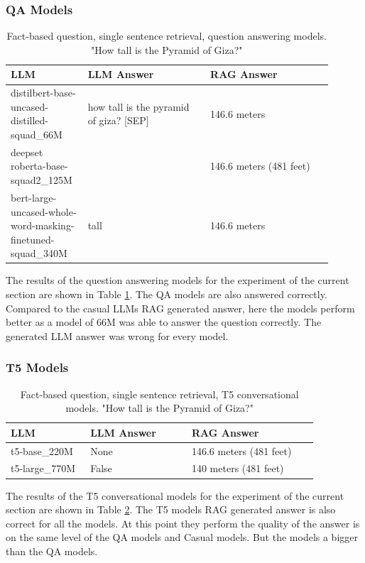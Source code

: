 \documentclass{wseas}
\begin{document}
\subsubsection{QA Models}

\begin{table}[htbp]
  \caption{Fact-based question, single sentence retrieval, question answering models. "How tall is the Pyramid of Giza?"} %
  \centering
  \label{tab:experiment_R_1_sentence_Q_fact_M_question_answering_table}  %
    \begin{tabular}{|p{0.2\linewidth}|p{0.35\linewidth}|p{0.35\linewidth}|}
      \hline
      \textbf{LLM} & \textbf{LLM Answer} & \textbf{RAG Answer} \\ \hline
      distilbert-base-uncased-distilled-squad\_66M & how tall is the pyramid of giza? {[}SEP{]} & 146.6 meters \\ \hline
      deepset roberta-base-squad2\_125M &  & 146.6 meters (481 feet) \\ \hline
      bert-large-uncased-whole-word-masking-finetuned-squad\_340M & tall & 146.6 meters \\ \hline
    \end{tabular}
\end{table}
The results of the question answering models for the experiment of the 
current section are shown in Table \ref{tab:experiment_R_1_sentence_Q_fact_M_question_answering_table}.
The QA models are also answered correctly. Compared to the casual LLMs
RAG generated answer, here the models perform better as a model of 66M
was able to answer the question correctly. The generated LLM answer was
wrong for every model.

\subsubsection{T5 Models}

\begin{table}[htbp]
  \centering
  \caption{Fact-based question, single sentence retrieval, T5 conversational models. "How tall is the Pyramid of Giza?"} %
  \label{tab:experiment_R_1_sentence_Q_fact_M_T5_table}  %
  \begin{tabular}{|p{0.22\linewidth}|p{0.29\linewidth}|p{0.35\linewidth}|}
    \hline
    \textbf{LLM} & \textbf{LLM Answer} & \textbf{RAG Answer} \\ \hline
    t5-base\_220M & None & 146.6 meters (481 feet) \\ \hline
    t5-large\_770M & False & 140 meters (481 feet) \\ \hline
  \end{tabular}
\end{table}
The results of the T5 conversational models for the experiment of the 
current section are shown in Table \ref{tab:experiment_R_1_sentence_Q_fact_M_T5_table}.
The T5 models RAG generated answer is also correct for all the models.
At this point they perform the quality of the answer is on the same
level of the QA models and Casual models. But the models a bigger than
the QA models.
\end{document}
